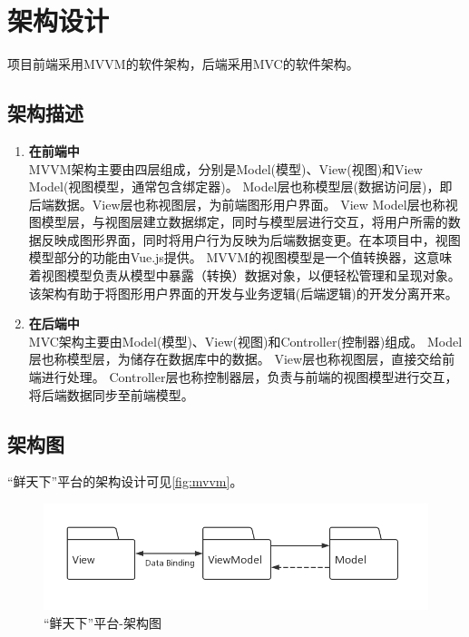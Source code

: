 \chapter{架构设计}

项目前端采用MVVM的软件架构，后端采用MVC的软件架构。

\section{架构描述}

\begin{enumerate}
    \item \textbf{在前端中} \\
    MVVM架构主要由四层组成，分别是Model(模型)、View(视图)和View Model(视图模型，通常包含绑定器)。
    Model层也称模型层(数据访问层)，即后端数据。View层也称视图层，为前端图形用户界面。
    View Model层也称视图模型层，与视图层建立数据绑定，同时与模型层进行交互，将用户所需的数据反映成图形界面，同时将用户行为反映为后端数据变更。在本项目中，视图模型部分的功能由Vue.js提供。
    MVVM的视图模型是一个值转换器，这意味着视图模型负责从模型中暴露（转换）数据对象，以便轻松管理和呈现对象。\\
    该架构有助于将图形用户界面的开发与业务逻辑(后端逻辑)的开发分离开来。
    \item \textbf{在后端中} \\
    MVC架构主要由Model(模型)、View(视图)和Controller(控制器)组成。
    Model层也称模型层，为储存在数据库中的数据。
    View层也称视图层，直接交给前端进行处理。
    Controller层也称控制器层，负责与前端的视图模型进行交互，将后端数据同步至前端模型。
\end{enumerate}


\section{架构图}

“鲜天下”平台的架构设计可见\autoref{fig:mvvm}。

\begin{figure}[htp]
    \centering
    \includegraphics[width=15cm]{figure/mvvm.jpg}
    \caption{“鲜天下”平台-架构图}
    \label{fig:mvvm}
\end{figure}


